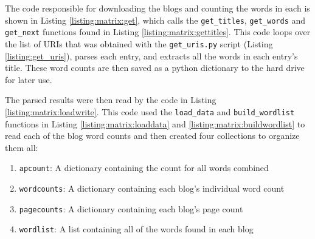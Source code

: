 The code responsible for downloading the blogs and counting the words in each is shown in Listing \ref{listing:matrix:get}, which calls the {\tt get\_titles}, {\tt get\_words} and {\tt get\_next} functions found in Listing \ref{listing:matrix:gettitles}. This code loops over the list of URIs that was obtained with the {\tt get\_uris.py} script (Listing \ref{listing:get_uris}), parses each entry, and extracts all the words in each entry's title. These word counts are then saved as a python dictionary to the hard drive for later use. 



\clearpage



The parsed results were then read by the code in Listing \ref{listing:matrix:loadwrite}. This code used the {\tt load\_data} and {\tt build\_wordlist} functions in Listing \ref{listing:matrix:loaddata} and \ref{listing:matrix:buildwordlist} to read each of the blog word counts and then created four collections to organize them all:

\begin{enumerate}
	\item {\tt apcount}: A dictionary containing the count for all words combined
	\item {\tt wordcounts}: A dictionary containing each blog's individual word count
	\item {\tt pagecounts}: A dictionary containing each blog's page count
	\item {\tt wordlist}: A list containing all of the words found in each blog
\end{enumerate}



\clearpage





